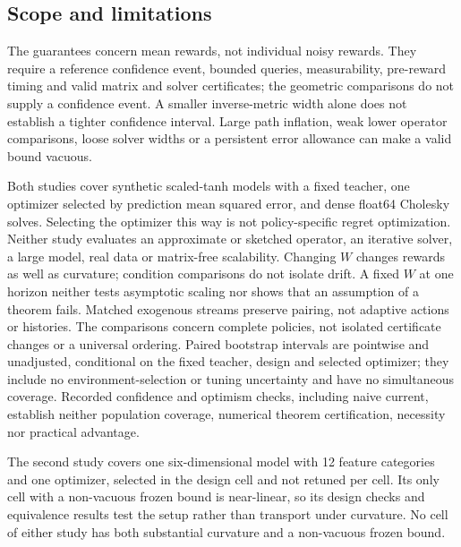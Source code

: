 \subsection{Scope and limitations}\label{sec:scope-limitations}

The guarantees concern mean rewards, not individual noisy rewards. They require
a reference confidence event, bounded queries, measurability, pre-reward
timing and valid matrix and solver certificates; the geometric comparisons do
not supply a confidence event. A smaller inverse-metric width alone does not
establish a tighter confidence interval. Large path inflation, weak lower
operator comparisons, loose solver widths or a persistent error allowance can
make a valid bound vacuous.

Both studies cover synthetic scaled-tanh models with a fixed teacher, one
optimizer selected by prediction mean squared error, and dense float64
Cholesky solves. Selecting the optimizer this way is not policy-specific regret
optimization. Neither study evaluates an approximate or sketched operator, an
iterative solver, a large model, real data or matrix-free scalability.
Changing $W$ changes rewards as well as curvature; condition comparisons do not
isolate drift. A fixed $W$ at one horizon neither tests asymptotic scaling nor
shows that an assumption of a theorem fails. Matched exogenous streams preserve
pairing, not adaptive actions or histories. The comparisons concern complete
policies, not isolated certificate changes or a universal ordering. Paired
bootstrap intervals are pointwise and unadjusted, conditional on the fixed
teacher, design and selected optimizer; they include no environment-selection
or tuning uncertainty and have no simultaneous coverage. Recorded confidence and
optimism checks, including naive current, establish neither population
coverage, numerical theorem certification, necessity nor practical advantage.

The second study covers one six-dimensional model with 12 feature categories
and one optimizer, selected in the design cell and not retuned per cell. Its
only cell with a non-vacuous frozen bound is near-linear, so its design checks
and equivalence results test the setup rather than transport under curvature.
No cell of either study has both substantial curvature and a non-vacuous
frozen bound.
